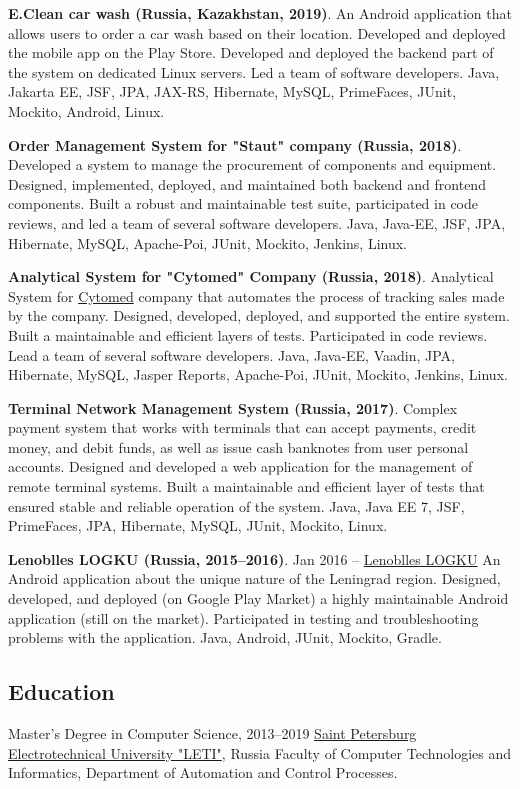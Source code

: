 \documentclass{vl}
\begin{document}
\textbf{E.Clean car wash (Russia, Kazakhstan, 2019)}.
An Android application that allows users to order a car wash based on their location.
Developed and deployed the mobile app on the Play Store.
Developed and deployed the backend part of the system on dedicated Linux servers.
Led a team of software developers.
Java, Jakarta EE, JSF, JPA, JAX-RS, Hibernate, MySQL, PrimeFaces, JUnit, Mockito, Android, Linux.

\textbf{Order Management System for "Staut" company (Russia, 2018)}.
Developed a system to manage the procurement of components and equipment.
Designed, implemented, deployed, and maintained both backend and frontend components.
Built a robust and maintainable test suite, participated in code reviews, and led a team of several software developers.
Java, Java‐EE, JSF, JPA, Hibernate, MySQL, Apache-Poi, JUnit, Mockito, Jenkins, Linux.

\textbf{Analytical System for "Cytomed" Company (Russia, 2018)}.
Analytical System for \href{https://cytomed.ru/en/}{Cytomed} company that automates the process of tracking sales
made by the company.
Designed, developed, deployed, and supported the entire system.
Built a maintainable and efficient layers of tests.
Participated in code reviews.
Lead a team of several software developers.
Java, Java‐EE, Vaadin, JPA, Hibernate, MySQL, Jasper Reports, Apache-Poi, JUnit, Mockito, Jenkins, Linux.

\textbf{Terminal Network Management System (Russia, 2017)}.
Complex payment system that works with terminals that can accept payments, credit money, and debit funds,
as well as issue cash banknotes from user personal accounts.
Designed and developed a web application for the management of remote terminal systems.
Built a maintainable and efficient layer of tests that ensured stable and reliable operation of the system.
Java, Java EE 7, JSF, PrimeFaces, JPA, Hibernate, MySQL, JUnit, Mockito, Linux.

\textbf{Lenoblles LOGKU (Russia, 2015--2016)}.
Jan 2016 – \href{https://play.google.com/store/apps/details?id=com.altinntech.oopt_lo}{Lenoblles LOGKU}
An Android application about the unique nature of the Leningrad region.
Designed, developed, and deployed (on Google Play Market) a highly maintainable Android application
(still on the market).
Participated in testing and troubleshooting problems with the application.
Java, Android, JUnit, Mockito, Gradle.

\subsection*{Education}
\begin{samepage}
    Master's Degree in Computer Science, 2013--2019\newline
    \href{https://etu.ru/en/university/}{Saint Petersburg Electrotechnical University "LETI"}, Russia\newline
    Faculty of Computer Technologies and Informatics, Department of Automation and Control Processes.
\end{samepage}
\end{document}
